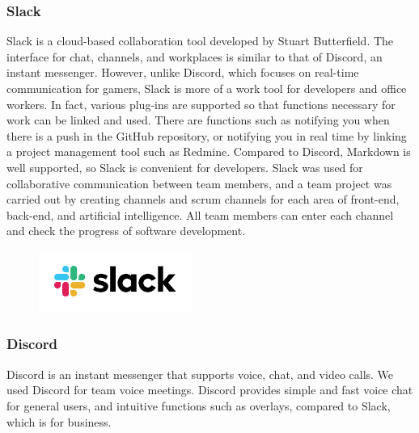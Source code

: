 \documentclass[conference]{IEEEtran}
\begin{document}
\subsubsection{Slack}
Slack is a cloud-based collaboration tool developed by Stuart Butterfield. The interface for chat, channels, and workplaces is similar to that of Discord, an instant messenger. However, unlike Discord, which focuses on real-time communication for gamers, Slack is more of a work tool for developers and office workers. In fact, various plug-ins are supported so that functions necessary for work can be linked and used. There are functions such as notifying you when there is a push in the GitHub repository, or notifying you in real time by linking a project management tool such as Redmine. Compared to Discord, Markdown is well supported, so Slack is convenient for developers. Slack was used for collaborative communication between team members, and a team project was carried out by creating channels and scrum channels for each area of front-end, back-end, and artificial intelligence. All team members can enter each channel and check the progress of software development.\\

\begin{figure}[h!]
\centering
\includegraphics[width=5cm]{imagefolder/slack.png}
\caption{}
\label{fig:map}
\end{figure}

\subsubsection{Discord}
Discord is an instant messenger that supports voice, chat, and video calls. We used Discord for team voice meetings. Discord provides simple and fast voice chat for general users, and intuitive functions such as overlays, compared to Slack, which is for business.\\
\\
\\
\\
\\
\\
\\
\\
\\
\\
\\
\end{document}
